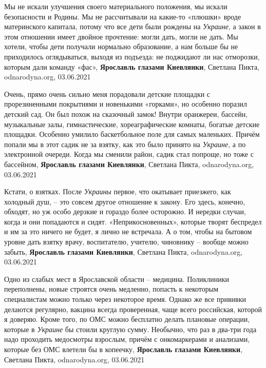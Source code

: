 Мы не искали улучшения своего материального положения, мы искали безопасности и
Родины.  Мы не рассчитывали на какие-то «плюшки» вроде материнского капитала,
потому что все дети были рождены на \emph{Украине}, а закон в этом отношении имеет
двойное прочтение: могли дать, могли не дать. Мы хотели, чтобы дети получали
нормально образование, а нам больше бы не приходилось оглядываться, выходя из
подъезда: не поджидают ли нас отморозки, которым дали команду «фас»,
\textbf{Ярославль глазами Киевлянки},
Светлана Пикта, odnarodyna.org, 03.06.2021

Очень, прямо очень сильно меня порадовали детские площадки с прорезиненными
покрытиями и новенькими «горками», но особенно поразил детский сад. Он был
похож на сказочный замок! Внутри оранжереи, бассейн, музыкальные залы,
гимнастические, хореаграфические комнаты, богатые детские площадки. Особенно
умилило баскетбольное поле для самых маленьких. Причём попали мы в этот садик
не за взятку, как это было принято на \emph{Украине}, а по электронной очереди.  Когда
мы сменили район, садик стал попроще, но тоже с бассейном,
\textbf{Ярославль глазами Киевлянки},
Светлана Пикта, odnarodyna.org, 03.06.2021

Кстати, о взятках. После \emph{Украины} первое, что окатывает приезжего, как
холодный душ, – это совсем другое отношение к закону. Его здесь, конечно,
обходят, но уж особо дерзкие и гораздо более осторожно. И нередки случаи, когда
и они попадаются и сидят. «Неприкосновенных», которые творят беспредел и им за
это ничего не будет, я лично не встречала. А о том, чтобы на бытовом уровне
дать взятку врачу, воспитателю, учителю, чиновнику – вообще можно забыть,
\textbf{Ярославль глазами Киевлянки},
Светлана Пикта, odnarodyna.org, 03.06.2021

Одно из слабых мест в Ярославской области – медицина.  Поликлиники переполнены,
новые строятся очень медленно, попасть к некоторым специалистам можно только
через некоторое время. Однако же все прививки делаются регулярно, вакцина
всегда проверенная, чаще всего российская, которой я доверяю. Кроме того, по
ОМС можно бесплатно делать плановые операции, которые в \emph{Украине} бы
стоили круглую сумму. Необычно, что раз в два-три года надо проходить
медосмотры взрослым, причём с онкомаркерами и анализами, которые без ОМС
влетели бы в копеечку,
\textbf{Ярославль глазами Киевлянки},
Светлана Пикта, odnarodyna.org, 03.06.2021

